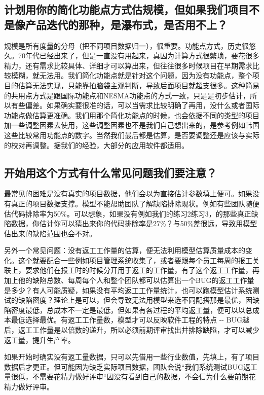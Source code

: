 \hypertarget{ux8ba1ux5212ux7528ux4f60ux7684ux7b80ux5316ux529fux80fdux70b9ux65b9ux5f0fux4f30ux89c4ux6a21ux4f46ux5982ux679cux6211ux4eecux9879ux76eeux4e0dux662fux50cfux4ea7ux54c1ux8fedux4ee3ux7684ux90a3ux79cdux662fux7011ux5e03ux5f0fux662fux5426ux7528ux4e0dux4e0a}{%
\subsection{计划用你的简化功能点方式估规模，但如果我们项目不是像产品迭代的那种，是瀑布式，是否用不上？}\label{ux8ba1ux5212ux7528ux4f60ux7684ux7b80ux5316ux529fux80fdux70b9ux65b9ux5f0fux4f30ux89c4ux6a21ux4f46ux5982ux679cux6211ux4eecux9879ux76eeux4e0dux662fux50cfux4ea7ux54c1ux8fedux4ee3ux7684ux90a3ux79cdux662fux7011ux5e03ux5f0fux662fux5426ux7528ux4e0dux4e0a}}

规模是所有度量的分母（把不同项目数据归一），很重要。功能点方式，历史很悠久。70年代已经出来了，但是一直没有用起来，真因为计算方式很繁琐，要花很多精力，还有需求比较具体、详细才可以算出来，但往往很多时候项目在早期需求比较模糊，就无法用。我们简化功能点就是针对这个问题，因为没有功能点，整个项目的估算无法实现，只能靠拍脑袋主观判断，导致后面项目就超支很多。这种简易的共用点方式是跟国际功能点和NESMA功能点的方式一致，只是是初步估计，所以有些偏差。如果确实要很准的话，可以当需求比较明确了再用，没什么或者国际功能点做估算更准确。我们用那个简化功能点的时候，也会依据不同的类型的项目加一些调整因素去使用，这些调整因素也不是我们自己想出来的，是参考例如韩国这些比较常用功能点的数字。当然我们最后都是估算，是否要调整还是应该与实际的校对再调整。据我们的经验，大部分的应用软件都适用。

\hypertarget{ux5f00ux59cbux7528ux8fd9ux4e2aux65b9ux5f0fux6709ux4ec0ux4e48ux5e38ux89c1ux95eeux9898ux6211ux4eecux8981ux6ce8ux610f}{%
\subsection{开始用这个方式有什么常见问题我们要注意？}\label{ux5f00ux59cbux7528ux8fd9ux4e2aux65b9ux5f0fux6709ux4ec0ux4e48ux5e38ux89c1ux95eeux9898ux6211ux4eecux8981ux6ce8ux610f}}

最常见的困难是没有真实的项目数据，他们会以为直接估计参数填上便可。如果没有真正的项目数据支撑。模型不能帮助团队了解缺陷排除现状。例如有些团队随便估代码排除率为50\%。可以想象，如果没有例如我们的练习2练习3，的那些真正缺陷数据，你估计你可以猜出来你的代码排除率是27\%？与50\%差很远，导致用模型估出来的缺陷范围也会不对。

另外一个常见问题：没有返工工作量的估算，便无法利用模型估算质量成本的变化。这个就要配合一些例如项目管理系统收集了，或者要跟每个员工每周的报工关联上，要求他们在报工时的时候分开用于返工的工作量，有了这个返工工作量，再加上他的缺陷总数、每周每个人和整个团队都可以估算出一个BUG的返工工作量是多少？有人可能质疑，如果没有平均返工工作量统计，也可以跑模型估计系统测试的缺陷密度？理论上是可以，但会导致无法用模型来选不同配搭那是最优，因缺陷密度最低，总成本不一定是最低，但如果有各过程的平均返工量，便可以以总成本最低选择最优。有返工工作量数，模型才可以反映软件工程的特点
-\/-
BUG越后，返工工作量是以倍数的递升，所以必须前期评审找出并排除缺陷，才可以减少返工量，提升生产率。

如果开始时确实没有返工量数据，只可以先借用一些行业数值，先填上，有了项目数据后才更正。但可能因为缺乏实际项目数据，团队会说``我们系统测试BUG返工量很低，不需要花精力做好评审``因没有看到自己的数据，不会信为什么要前期花精力做好评审。

